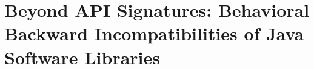 
\chapter{Beyond API Signatures: Behavioral Backward Incompatibilities of Java Software Libraries}








%

